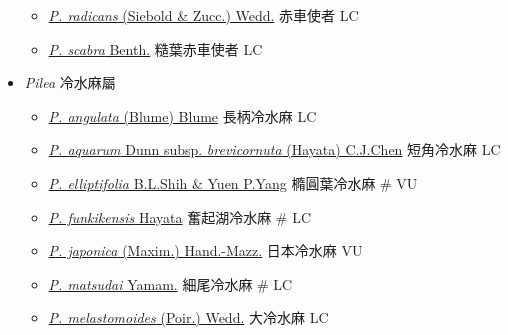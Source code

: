 \begin{itemize}
  \begin{itemize}
        \item[] \href{http://www.theplantlist.org/tpl1.1/search?q=Pellionia+radicans}{\textit{P. radicans} (Siebold \& Zucc.) Wedd.}   赤車使者   LC
        \item[] \href{http://www.theplantlist.org/tpl1.1/search?q=Pellionia+scabra}{\textit{P. scabra} Benth.}   糙葉赤車使者   LC
  \end{itemize}
 \item[] \textit{Pilea} 冷水麻屬
                                
  \begin{itemize}
        \item[] \href{http://www.theplantlist.org/tpl1.1/search?q=Pilea+angulata}{\textit{P. angulata} (Blume) Blume}   長柄冷水麻   LC
        \item[] \href{http://www.theplantlist.org/tpl1.1/search?q=Pilea+aquarum+subsp.+brevicornuta}{\textit{P. aquarum} Dunn subsp. \textit{brevicornuta} (Hayata) C.J.Chen}   短角冷水麻   LC
        \item[] \href{http://www.theplantlist.org/tpl1.1/search?q=Pilea+elliptifolia}{\textit{P. elliptifolia} B.L.Shih \& Yuen P.Yang}   橢圓葉冷水麻  \# VU
        \item[] \href{http://www.theplantlist.org/tpl1.1/search?q=Pilea+funkikensis}{\textit{P. funkikensis} Hayata}   奮起湖冷水麻  \# LC
        \item[] \href{http://www.theplantlist.org/tpl1.1/search?q=Pilea+japonica}{\textit{P. japonica} (Maxim.) Hand.-Mazz.}   日本冷水麻   VU
        \item[] \href{http://www.theplantlist.org/tpl1.1/search?q=Pilea+matsudai}{\textit{P. matsudai} Yamam.}   細尾冷水麻  \# LC
        \item[] \href{http://www.theplantlist.org/tpl1.1/search?q=Pilea+melastomoides}{\textit{P. melastomoides} (Poir.) Wedd.}   大冷水麻   LC

\end{itemize}
\end{itemize}

